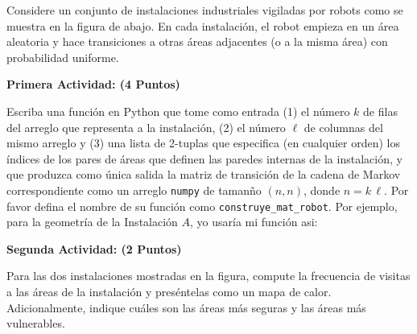 \documentclass[ a4paper, twoside, 11pt]{article}
\begin{document}
\begin{problem}
Considere un conjunto de instalaciones industriales vigiladas por robots como se muestra en la figura de abajo. En cada instalaci\'on, el robot empieza en un \'area aleatoria y hace transiciones a otras \'areas adjacentes (o a la misma \'area) con probabilidad uniforme. 

\begin{figure}[htb]
\centering
\def\svgwidth{0.9\columnwidth}

\end{figure}

\textbf{Primera Actividad: (4 Puntos)}

Escriba una funci\'on en Python que tome como entrada (1) el n\'umero $k$ de filas del arreglo que representa a la instalaci\'on, (2) el n\'umero $\ell$ de columnas del mismo arreglo y (3) una lista de 2-tuplas que especifica (en cualquier orden) los \'indices de los pares de \'areas que definen las paredes internas de la instalaci\'on, y que produzca como \'unica salida la matriz de transici\'on de la cadena de Markov correspondiente como un arreglo {\tt numpy} de taman\~no $(n,n)$, donde $n = k \, \ell$. Por favor defina el nombre de su funci\'on como {\tt construye\_mat\_robot}. Por ejemplo, para la geometr\'ia de la Instalaci\'on $A$, yo usar\'ia mi funci\'on asi:
\halfskip


\textbf{Segunda Actividad: (2 Puntos)}

Para las dos instalaciones mostradas en la figura, compute la frecuencia de visitas a las \'areas de la instalaci\'on y pres\'entelas como un mapa de calor. Adicionalmente, indique cu\'ales son las \'areas m\'as seguras y las \'areas m\'as vulnerables. 


\end{problem}
\end{document}
